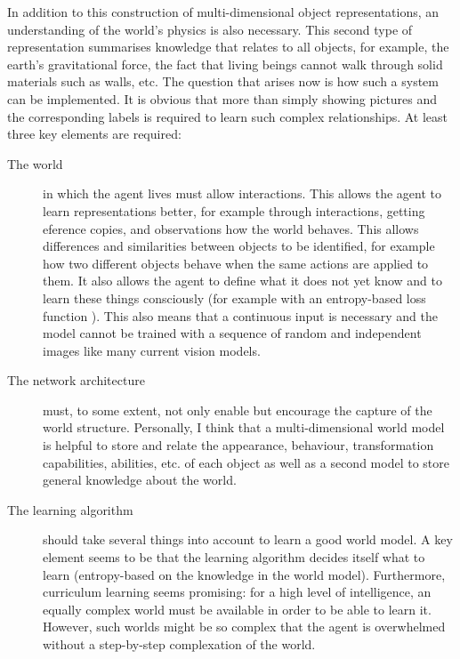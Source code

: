 In addition to this construction of multi-dimensional object representations, an understanding of the world's physics is also necessary. This second type of representation summarises knowledge that relates to all objects, for example, the earth's gravitational force, the fact that living beings cannot walk through solid materials such as walls, etc. The question that arises now is how such a system can be implemented. It is obvious that more than simply showing pictures and the corresponding labels is required to learn such complex relationships. At least three key elements are required:















\begin{description}
	\item[The world] in which the agent lives must allow interactions. This allows the agent to learn representations better, for example through interactions, getting eference copies, and observations how the world behaves. This allows differences and similarities between objects to be identified, for example how two different objects behave when the same actions are applied to them. It also allows the agent to define what it does not yet know and to learn these things consciously (for example with an entropy-based loss function ). This also means that a continuous input is necessary and the model cannot be trained with a sequence of random and independent images like many current vision models.
	\item[The network architecture] must, to some extent, not only enable but encourage the capture of the world structure. Personally, I think that a multi-dimensional world model is helpful to store and relate the appearance, behaviour, transformation capabilities, abilities, etc. of each object as well as a second model to store general knowledge about the world. %
	\item[The learning algorithm] should take several things into account to learn a good world model. A key element seems to be that the learning algorithm decides itself what to learn (entropy-based on the knowledge in the world model). Furthermore, curriculum learning seems promising: for a high level of intelligence, an equally complex world must be available in order to be able to learn it. However, such worlds might be so complex that the agent is overwhelmed without a step-by-step complexation of the world.%
\end{description}


